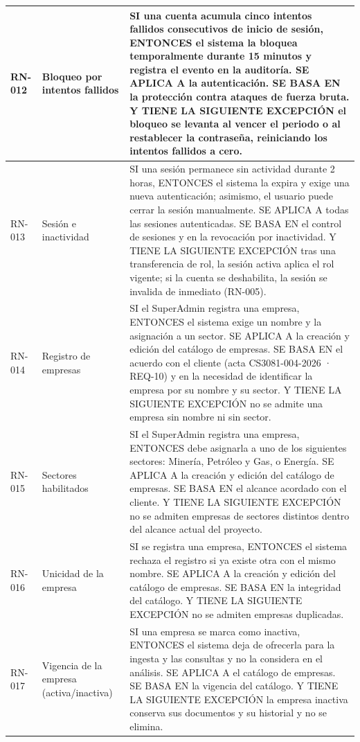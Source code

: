 \begin{longtable}{|C{1.4cm}|L{4.0cm}|L{9.4cm}|}
\hline
RN-012 & Bloqueo por intentos fallidos & SI una cuenta acumula cinco intentos fallidos consecutivos de inicio de sesión, ENTONCES el sistema la bloquea temporalmente durante 15 minutos y registra el evento en la auditoría. SE APLICA A la autenticación. SE BASA EN la protección contra ataques de fuerza bruta. Y TIENE LA SIGUIENTE EXCEPCIÓN el bloqueo se levanta al vencer el periodo o al restablecer la contraseña, reiniciando los intentos fallidos a cero. \\
\hline
RN-013 & Sesión e inactividad & SI una sesión permanece sin actividad durante 2 horas, ENTONCES el sistema la expira y exige una nueva autenticación; asimismo, el usuario puede cerrar la sesión manualmente. SE APLICA A todas las sesiones autenticadas. SE BASA EN el control de sesiones y en la revocación por inactividad. Y TIENE LA SIGUIENTE EXCEPCIÓN tras una transferencia de rol, la sesión activa aplica el rol vigente; si la cuenta se deshabilita, la sesión se invalida de inmediato (RN-005). \\
\hline
RN-014 & Registro de empresas & SI el SuperAdmin registra una empresa, ENTONCES el sistema exige un nombre y la asignación a un sector. SE APLICA A la creación y edición del catálogo de empresas. SE BASA EN el acuerdo con el cliente (acta CS3081-004-2026 · REQ-10) y en la necesidad de identificar la empresa por su nombre y su sector. Y TIENE LA SIGUIENTE EXCEPCIÓN no se admite una empresa sin nombre ni sin sector. \\
\hline
RN-015 & Sectores habilitados & SI el SuperAdmin registra una empresa, ENTONCES debe asignarla a uno de los siguientes sectores: Minería, Petróleo y Gas, o Energía. SE APLICA A la creación y edición del catálogo de empresas. SE BASA EN el alcance acordado con el cliente. Y TIENE LA SIGUIENTE EXCEPCIÓN no se admiten empresas de sectores distintos dentro del alcance actual del proyecto. \\
\hline
RN-016 & Unicidad de la empresa & SI se registra una empresa, ENTONCES el sistema rechaza el registro si ya existe otra con el mismo nombre. SE APLICA A la creación y edición del catálogo de empresas. SE BASA EN la integridad del catálogo. Y TIENE LA SIGUIENTE EXCEPCIÓN no se admiten empresas duplicadas. \\
\hline
RN-017 & Vigencia de la empresa (activa/inactiva) & SI una empresa se marca como inactiva, ENTONCES el sistema deja de ofrecerla para la ingesta y las consultas y no la considera en el análisis. SE APLICA A el catálogo de empresas. SE BASA EN la vigencia del catálogo. Y TIENE LA SIGUIENTE EXCEPCIÓN la empresa inactiva conserva sus documentos y su historial y no se elimina. \\

\end{longtable}
